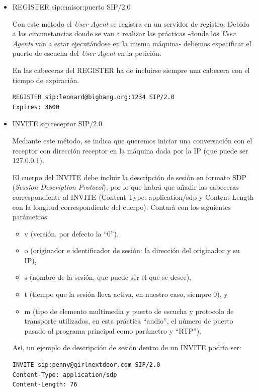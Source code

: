 \documentclass[a4paper,11pt]{article}
\begin{document}
  \begin{itemize}
    \item REGISTER sip:emisor:puerto SIP/2.0

    Con este método el \emph{User Agent} se registra en un servidor de registro. Debido a las circunstancias donde se van a realizar las prácticas -donde los \emph{User Agents} van a estar ejecutándose en la misma máquina- debemos especificar el puerto de escucha del \emph{User Agent} en la petición.

    En las cabeceras del REGISTER ha de incluirse siempre una cabecera con el tiempo de expiración.

\begin{verbatim}
REGISTER sip:leonard@bigbang.org:1234 SIP/2.0
Expires: 3600
\end{verbatim}

    \item INVITE sip:receptor SIP/2.0

    Mediante este método, se indica que queremos iniciar una conversación con el receptor con dirección receptor en la máquina dada por la IP (que puede ser 127.0.0.1).

    El cuerpo del INVITE debe incluir la descripción de sesión en formato
 SDP (\emph{Session Description Protocol}), por lo que habrá que añadir las cabeceras correspondiente al INVITE (Content-Type: application/sdp y Content-Length con la longitud correspondiente del cuerpo). Contará con los siguientes parámetros:

\begin{itemize}
  \item v (versión, por defecto la ``0''),
  \item o (originador e identificador de sesión: la dirección del originador y su IP),
  \item s (nombre de la sesión, que puede ser el que se desee),
  \item t (tiempo que la sesión lleva activa, en nuestro caso, siempre 0), y
  \item m (tipo de elemento multimedia y puerto de escucha y protocolo de transporte utilizados, en esta práctica ``audio'', el número de puerto pasado al programa principal como parámetro y ``RTP'').
\end{itemize}

Así, un ejemplo de descripción de sesión dentro de un INVITE podría ser:

\begin{verbatim}
INVITE sip:penny@girlnextdoor.com SIP/2.0
Content-Type: application/sdp
Content-Length: 76


\end{verbatim}
\end{itemize}
\end{document}

